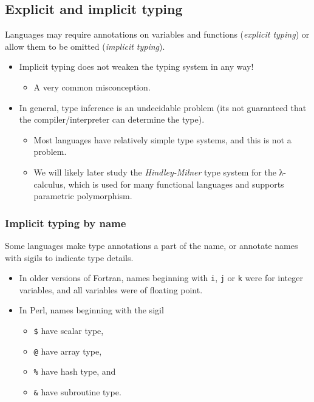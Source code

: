 \documentclass[11pt]{article}
\theoremstyle{definition}
\begin{document}
\subsection{Explicit and implicit typing}
\label{sec:org55685ed}

Languages may require annotations on variables and functions
(\emph{explicit typing}) or allow them to be omitted (\emph{implicit typing}).
\begin{itemize}
\item Implicit typing does not weaken the typing system in any way!
\begin{itemize}
\item A very common misconception.
\end{itemize}
\item In general, type inference is an undecidable problem
(its not guaranteed that the compiler/interpreter can
determine the type).
\begin{itemize}
\item Most languages have relatively simple type systems,
and this is not a problem.
\item We will likely later study the \emph{Hindley-Milner} type system
for the λ-calculus, which is used for many
functional languages and supports parametric polymorphism.
\end{itemize}
\end{itemize}

\subsubsection{Implicit typing by name}
\label{sec:orga2edfc2}

Some languages make type annotations a part of the name,
or annotate names with sigils to indicate type details.
\begin{itemize}
\item In older versions of Fortran, names beginning with
\texttt{i}, \texttt{j} or \texttt{k} were for integer variables,
and all variables were of floating point.
\item In Perl, names beginning with the sigil
\begin{itemize}
\item \texttt{\$} have scalar type,
\item \texttt{@} have array type,
\item \texttt{\%} have hash type, and
\item \texttt{\&} have subroutine type.
\end{itemize}
\end{itemize}
\end{document}

